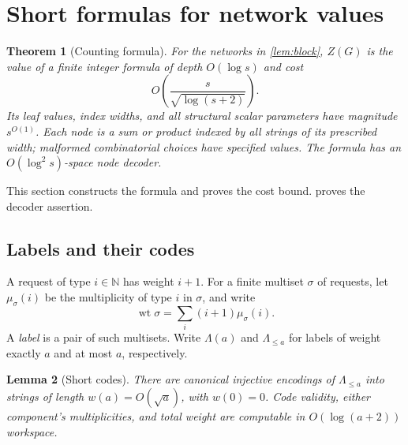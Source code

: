 \documentclass[11pt]{article}
\newtheorem{theorem}{Theorem}[section]
\newtheorem{lemma}[theorem]{Lemma}
\theoremstyle{definition}
\theoremstyle{remark}
\newcommand{\N}{\mathbb N}
\newcommand{\wt}{\operatorname{wt}}
\begin{document}
\section{Short formulas for network values}\label{sec:short}

\begin{theorem}[Counting formula]\label{thm:formula}
For the networks in \cref{lem:block}, $Z(G)$ is the value of a finite integer formula of depth $O(\log s)$ and cost
\[
 O\!\left(\frac{s}{\sqrt{\log(s+2)}}\right).
\]
Its leaf values, index widths, and all structural scalar parameters have magnitude $s^{O(1)}$. Each node is a sum or product indexed by all strings of its prescribed width; malformed combinatorial choices have specified values. The formula has an $O(\log^2s)$-space node decoder.
\end{theorem}

This section constructs the formula and proves the cost bound.  proves the decoder assertion.

\subsection{Labels and their codes}

A request of type $i\in\N$ has weight $i+1$. For a finite multiset $\sigma$ of requests, let $\mu_\sigma(i)$ be the multiplicity of type $i$ in $\sigma$, and write
\[
 \wt\sigma=\sum_i(i+1)\mu_\sigma(i).
\]
A \emph{label} is a pair of such multisets. Write $\Lambda(a)$ and $\Lambda_{\le a}$ for labels of weight exactly $a$ and at most $a$, respectively.

\begin{lemma}[Short codes]\label{lem:codes}
There are canonical injective encodings of $\Lambda_{\le a}$ into strings of length $w(a)=O(\sqrt a)$, with $w(0)=0$. Code validity, either component's multiplicities, and total weight are computable in $O(\log(a+2))$ workspace.
\end{lemma}
\end{document}
